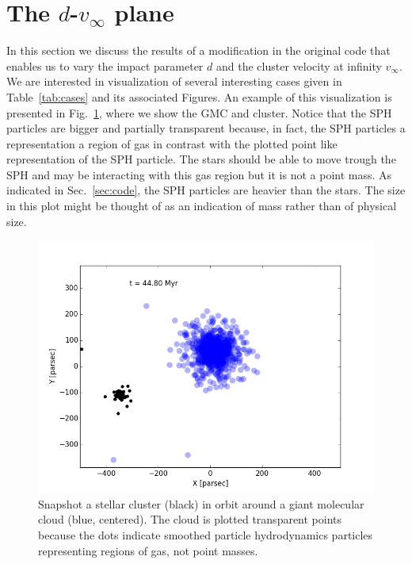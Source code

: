 \documentclass{aa}
\begin{document}
\section{The $d$-$v_\infty$ plane} \label{sec:dvplane}
In this section we discuss the results of a modification in the original code that enables us to vary the impact parameter $d$ and the cluster velocity at infinity $v_\infty$. We are interested in visualization of several interesting cases given in Table~\ref{tab:cases} and its associated Figures.
An example of this visualization is presented in Fig.~\ref{fig:GMC_with_cluster}, where we show the GMC and cluster. Notice that the SPH particles are bigger and partially transparent because, in fact, the SPH particles a representation a region of gas in contrast with the plotted point like representation of the SPH particle. The stars should be able to move trough the SPH and may be interacting with this gas region but it is not a point mass. As indicated in Sec.~\ref{sec:code}, the SPH particles are heavier than the stars. The size in this plot might be thought of as an indication of mass rather than of physical size. %

\begin{figure}
    \centering
    \includegraphics[width=\hsize]{img/test-44-8.png}
    \caption{Snapshot a stellar cluster (black) in orbit around a giant molecular cloud (blue, centered). The cloud is plotted transparent points because the dots indicate smoothed particle hydrodynamics particles representing regions of gas, not point masses.}\label{fig:GMC_with_cluster}
\end{figure}
\end{document}
